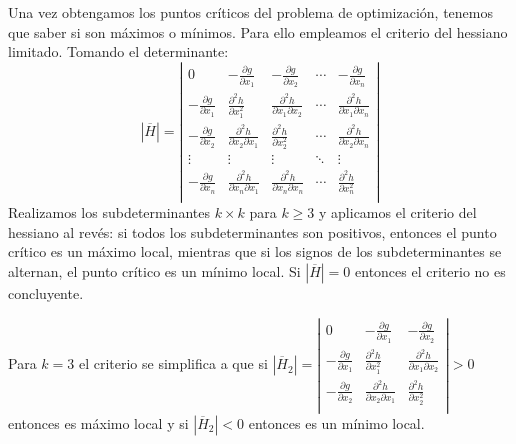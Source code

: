 \documentclass[a4paper]{article}
\begin{document}
Una vez obtengamos los puntos críticos del problema de optimización, tenemos que saber si son máximos o mínimos. Para ello empleamos el criterio del hessiano limitado. Tomando el determinante:
\[
|\overline{H}| = \left|\begin{matrix}
0 & -\frac{\partial g}{\partial x_1} & -\frac{\partial g}{\partial x_2} & \cdots & -\frac{\partial g}{\partial x_n} \\
-\frac{\partial g}{\partial x_1} & \frac{\partial^2 h}{\partial x_1^2} & \frac{\partial^2 h}{\partial x_1\partial x_2} & \cdots & \frac{\partial^2 h}{\partial x_1 \partial x_n}\\
-\frac{\partial g}{\partial x_2} & \frac{\partial^2 h}{\partial x_2\partial x_1} & \frac{\partial^2 h}{\partial x_2^2}  & \cdots & \frac{\partial^2 h}{\partial x_2 \partial x_n}\\
\vdots & \vdots & \vdots & \ddots & \vdots\\
-\frac{\partial g}{\partial x_n} & \frac{\partial^2 h}{\partial x_n\partial x_1} & \frac{\partial^2 h}{\partial x_n \partial x_n}  & \cdots & \frac{\partial^2 h}{\partial x_n^2}\\
\end{matrix} \right|
\]
Realizamos los subdeterminantes $k\times k$ para $k \ge 3 $ y aplicamos el criterio del hessiano al revés: si todos los subdeterminantes son positivos, entonces el punto crítico es un máximo local, mientras que si los signos de los subdeterminantes se alternan, el punto crítico es un mínimo local. Si $|\overline{H}| = 0$ entonces el criterio no es concluyente.

Para $k = 3 $ el criterio se simplifica a que si $|\overline{H}_2|  =
 \left|\begin{matrix}
0 & -\frac{\partial g}{\partial x_1} & -\frac{\partial g}{\partial x_2}  \\
-\frac{\partial g}{\partial x_1} & \frac{\partial^2 h}{\partial x_1^2} & \frac{\partial^2 h}{\partial x_1\partial x_2} \\
-\frac{\partial g}{\partial x_2} & \frac{\partial^2 h}{\partial x_2\partial x_1} & \frac{\partial^2 h}{\partial x_2^2}\\
\end{matrix} \right|
 > 0$ entonces es máximo local y si $|\overline{H}_2| < 0$ entonces es un mínimo local.


\newpage
\end{document}
